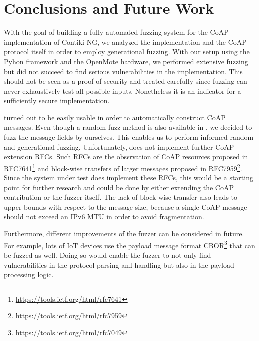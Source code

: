 \section{Conclusions and Future Work}
\label{section:conclusion}


With the goal of building a fully automated fuzzing system for the CoAP implementation of Contiki-NG, we analyzed the implementation and the CoAP protocol itself in order to employ generational fuzzing. With our setup using the Pyhon framework \scapy and the OpenMote hardware, we performed extensive fuzzing but did not succeed to find serious vulnerabilities in the implementation. This should not be seen as a proof of security and treated carefully since fuzzing can never exhaustively test all possible inputs. Nonetheless it is an indicator for a sufficiently secure implementation.

\scapy turned out to be easily usable in order to automatically construct CoAP messages. Even though a random fuzz method is also available in \scapy, we decided to fuzz the message fields by ourselves. This enables us to perform informed random and generational fuzzing. Unfortunately, \scapy does not implement further CoAP extension RFCs. Such RFCs are the observation of CoAP resources proposed in RFC7641\footnote{\url{https://tools.ietf.org/html/rfc7641}} and block-wise transfers of larger messages proposed in RFC7959\footnote{\url{https://tools.ietf.org/html/rfc7959}}. Since the system under test does implement these RFCs, this would be a starting point for further research and could be done by either extending the \scapy CoAP contribution or the fuzzer itself. The lack of block-wise transfer also leads to upper bounds with respect to the message size, because a single CoAP message should not exceed an IPv6 MTU in order to avoid fragmentation.

Furthermore, different improvements of the fuzzer can be considered in future. For example, lots of IoT devices use the payload message format CBOR\footnote{https://tools.ietf.org/html/rfc7049} that can be fuzzed as well. Doing so would enable the fuzzer to not only find vulnerabilities in the protocol parsing and handling but also in the payload processing logic. 


